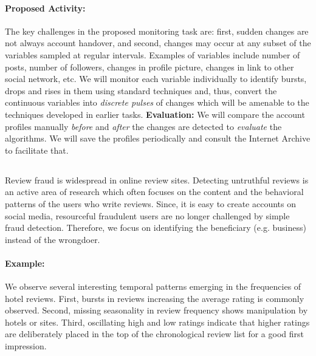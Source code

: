\paragraph{Proposed Activity:}

The key challenges in the proposed monitoring task are: first, sudden changes are not always account handover, and second, changes may occur at any subset of the variables sampled at regular intervals. Examples of variables include number of posts, number of followers, changes in profile picture, changes in link to other social network, etc. We will monitor each variable individually to identify bursts, drops and rises in them using standard techniques \cite{Vlachos:04} and, thus, convert the continuous variables into {\it discrete pulses} of changes which will be amenable to the techniques developed in earlier tasks.
\textbf{Evaluation:} We will compare the account profiles manually {\it before} and {\it after} the changes are detected to {\it evaluate} the algorithms. We will save the profiles periodically and consult the Internet Archive \cite{Archive} to facilitate that.



\subsection{\Tonethree}

Review fraud is widespread in online review sites. Detecting untruthful reviews is an active area of research which often focuses on the content and the behavioral patterns of the users who write reviews. Since, it is easy to create accounts on social media, resourceful fraudulent users are no longer challenged by simple fraud detection. Therefore, we focus on identifying the beneficiary (e.g. business) instead of the wrongdoer.

\paragraph{Example:} 

We observe several interesting temporal patterns emerging in the frequencies of hotel reviews. First, bursts in reviews increasing the average rating is commonly observed. Second, missing seasonality in review frequency shows manipulation by hotels or sites. Third, oscillating high and low ratings indicate that higher ratings are deliberately placed in the top of the chronological review list for a good first impression. 

